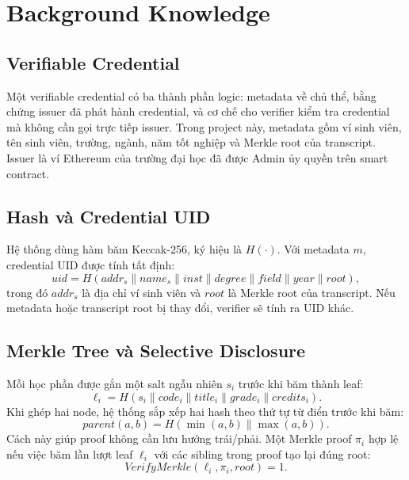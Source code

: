 \section{Background Knowledge}

\subsection{Verifiable Credential}

Một verifiable credential có ba thành phần logic: metadata về chủ thể, bằng chứng issuer đã phát hành credential, và cơ chế cho verifier kiểm tra credential mà không cần gọi trực tiếp issuer. Trong project này, metadata gồm ví sinh viên, tên sinh viên, trường, ngành, năm tốt nghiệp và Merkle root của transcript. Issuer là ví Ethereum của trường đại học đã được Admin ủy quyền trên smart contract.

\subsection{Hash và Credential UID}

Hệ thống dùng hàm băm Keccak-256, ký hiệu là $H(\cdot)$. Với metadata $m$, credential UID được tính tất định:
\begin{equation}
  uid = H(addr_s \parallel name_s \parallel inst \parallel degree \parallel field \parallel year \parallel root),
\end{equation}
trong đó $addr_s$ là địa chỉ ví sinh viên và $root$ là Merkle root của transcript. Nếu metadata hoặc transcript root bị thay đổi, verifier sẽ tính ra UID khác.

\subsection{Merkle Tree và Selective Disclosure}

Mỗi học phần được gắn một salt ngẫu nhiên $s_i$ trước khi băm thành leaf:
\begin{equation}
  \ell_i = H(s_i \parallel code_i \parallel title_i \parallel grade_i \parallel credits_i).
\end{equation}
Khi ghép hai node, hệ thống sắp xếp hai hash theo thứ tự từ điển trước khi băm:
\begin{equation}
  parent(a,b) = H(\min(a,b) \parallel \max(a,b)).
\end{equation}
Cách này giúp proof không cần lưu hướng trái/phải. Một Merkle proof $\pi_i$ hợp lệ nếu việc băm lần lượt leaf $\ell_i$ với các sibling trong proof tạo lại đúng root:
\begin{equation}
  VerifyMerkle(\ell_i, \pi_i, root) = 1.
\end{equation}

